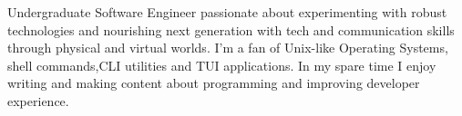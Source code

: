

\begin{cvparagraph}

    Undergraduate Software Engineer passionate about experimenting with robust technologies and nourishing next generation with tech and communication skills through physical and virtual worlds. I'm a fan of Unix-like Operating Systems, shell commands,CLI utilities and TUI applications. In my spare time I enjoy writing and making content about programming and improving developer experience.
\end{cvparagraph}
